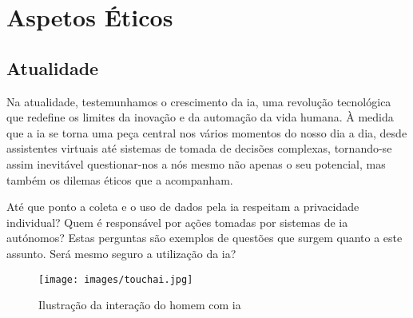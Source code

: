 \documentclass[a4paper, 11pt, onecolumn, oneside]{report}
\begin{document}
%
%
%
\chapter{Aspetos Éticos}
\label{chap.aspetos_eticos}
\section{Atualidade}
%
Na atualidade, testemunhamos o crescimento da \ac{ia}, uma revolução tecnológica que redefine os limites da inovação e da automação da vida humana. À medida que a \ac{ia} se torna uma peça central nos vários momentos do nosso dia a dia, desde assistentes virtuais até sistemas de tomada de decisões complexas, tornando-se assim inevitável questionar-nos a nós mesmo não apenas o seu potencial, mas também os dilemas éticos que a acompanham.
\par
Até que ponto a coleta e o uso de dados pela \ac{ia} respeitam a privacidade individual? Quem é responsável por ações tomadas por sistemas de \ac{ia} autónomos? Estas perguntas são exemplos de questões que surgem quanto a este assunto. Será mesmo seguro a utilização da \ac{ia}? 
\par
\par
\begin{figure}[ht]
    \centering
    \texttt{[image: images/touchai.jpg]}
    \caption{Ilustração da interação do homem com \ac{ia}\cite{i41}}
    \label{touchai}
\end{figure}

\end{document}
